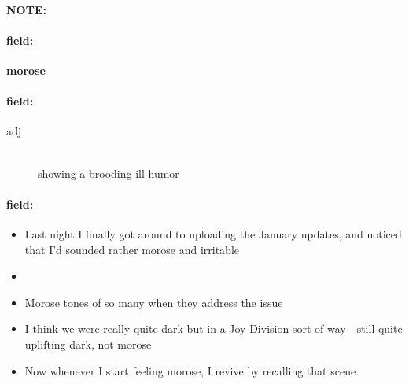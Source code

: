\documentclass[12pt]{article}
\newenvironment{note}{\paragraph{NOTE:}}{}
\newenvironment{field}{\paragraph{field:}}{}
\begin{document}
\begin{note}
\begin{field}
\textbf{\large morose}
\end{field}


\begin{field}
\begin{description}
\item[adj] \hfill \\ 
showing a brooding ill humor

\end{description}
\end{field}

\begin{field}
\begin{itemize}
\item Last night I finally got around to uploading the January updates, and noticed that I'd sounded rather morose and irritable
\item 
\item Morose tones of so many when they address the issue
\item I think we were really quite dark but in a Joy Division sort of way - still quite uplifting dark, not morose
\item Now whenever I start feeling morose, I revive by recalling that scene
\end{itemize}
\end{field}
\end{note}
\end{document}
